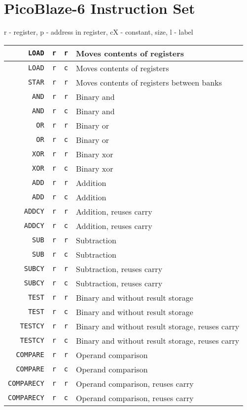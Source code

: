 \chapter{PicoBlaze-6 Instruction Set}\label{instrset}
\begin{table}[H]
\centering
r - register, p - address in register, cX - constant, size, l - label
\begin{tabular}{| r | c | c | l |}\hline

\verb|LOAD|&\verb|r|&\verb|r|& Moves contents of registers\\ \hline
\verb|LOAD|&\verb|r|&\verb|c|& Moves contents of registers\\ \hline
\verb|STAR|&\verb|r|&\verb|r|& Moves contents of registers between banks\\ \hline

\verb|AND|&\verb|r|&\verb|r|& Binary and\\ \hline
\verb|AND|&\verb|r|&\verb|c|& Binary and\\ \hline
\verb|OR|&\verb|r|&\verb|r|& Binary or\\ \hline
\verb|OR|&\verb|r|&\verb|c|& Binary or\\ \hline
\verb|XOR|&\verb|r|&\verb|r|& Binary xor\\ \hline
\verb|XOR|&\verb|r|&\verb|c|& Binary xor\\ \hline

\verb|ADD|&\verb|r|&\verb|r|& Addition\\ \hline
\verb|ADD|&\verb|r|&\verb|c|& Addition\\ \hline
\verb|ADDCY|&\verb|r|&\verb|r|& Addition, reuses carry\\ \hline
\verb|ADDCY|&\verb|r|&\verb|c|& Addition, reuses carry\\ \hline
\verb|SUB|&\verb|r|&\verb|r|& Subtraction\\ \hline
\verb|SUB|&\verb|r|&\verb|c|& Subtraction\\ \hline
\verb|SUBCY|&\verb|r|&\verb|r|& Subtraction, reuses carry\\ \hline
\verb|SUBCY|&\verb|r|&\verb|c|& Subtraction, reuses carry\\ \hline


\verb|TEST|&\verb|r|&\verb|r|& Binary and without result storage\\ \hline
\verb|TEST|&\verb|r|&\verb|c|& Binary and without result storage\\ \hline
\verb|TESTCY|&\verb|r|&\verb|r|& Binary and without result storage, reuses carry\\ \hline
\verb|TESTCY|&\verb|r|&\verb|c|& Binary and without result storage, reuses carry\\ \hline
\verb|COMPARE|&\verb|r|&\verb|r|& Operand comparison\\ \hline
\verb|COMPARE|&\verb|r|&\verb|c|& Operand comparison\\ \hline
\verb|COMPARECY|&\verb|r|&\verb|r|& Operand comparison, reuses carry\\ \hline
\verb|COMPARECY|&\verb|r|&\verb|c|& Operand comparison, reuses carry\\ \hline


\end{tabular}
\end{table}
